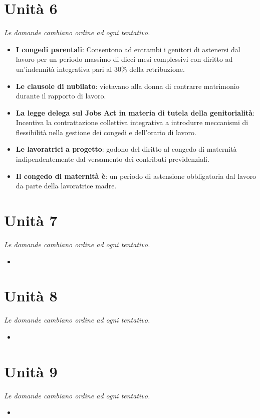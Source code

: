 \documentclass[12pt, a4paper]{report}
\begin{document}
\chapter{Unità 6}
    \textit{Le domande cambiano ordine ad ogni tentativo.}
    \begin{itemize}
        \item \textbf{I congedi parentali}: Consentono ad entrambi i genitori di astenersi dal lavoro per un periodo massimo di dieci mesi complessivi con diritto ad un’indennità integrativa pari al 30\% della retribuzione.
        \item \textbf{Le clausole di nubilato}: vietavano alla donna di contrarre matrimonio durante il rapporto di lavoro.
        \item \textbf{La legge delega sul Jobs Act in materia di tutela della genitorialità}: Incentiva la contrattazione collettiva integrativa a introdurre meccanismi di flessibilità nella gestione dei congedi e dell’orario di lavoro.
        \item \textbf{Le lavoratrici a progetto}: godono del diritto al congedo di maternità indipendentemente dal versamento dei contributi previdenziali.
        \item \textbf{Il congedo di maternità è}: un periodo di astensione obbligatoria dal lavoro da parte della lavoratrice madre.
    \end{itemize}
\chapter{Unità 7}
    \textit{Le domande cambiano ordine ad ogni tentativo.}
    \begin{itemize}
        \item 
    \end{itemize}
\chapter{Unità 8}
    \textit{Le domande cambiano ordine ad ogni tentativo.}
    \begin{itemize}
        \item 
    \end{itemize}
\chapter{Unità 9}
    \textit{Le domande cambiano ordine ad ogni tentativo.}
    \begin{itemize}
        \item 
    \end{itemize}
\end{document}
